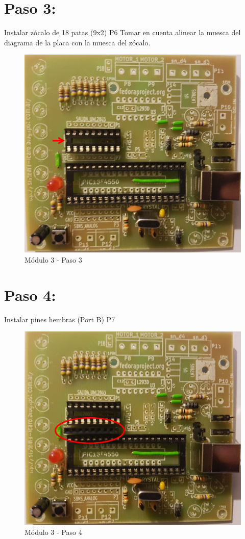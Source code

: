 \newpage

\section{Paso 3:}

Instalar zócalo de 18 patas (9x2) P6 Tomar en cuenta alinear la muesca del diagrama de la placa con la muesca del zócalo.

\begin{figure}[h]
	\centering
	\includegraphics[width=0.8\linewidth]{Modulo_3/M3_3}
	\caption{Módulo 3 - Paso 3}
	\label{fig:M3_3}
\end{figure}

\newpage

\section{Paso 4:}

Instalar pines hembras (Port B) P7

\begin{figure}[h]
	\centering
	\includegraphics[width=0.8\linewidth]{Modulo_3/M3_4}
	\caption{Módulo 3 - Paso 4}
	\label{fig:M3_4}
\end{figure}

